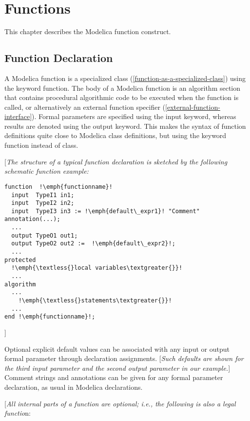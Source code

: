 \chapter{Functions}

This chapter describes the Modelica function construct.

\section{Function Declaration}

A Modelica function is a specialized class (\autoref{function-as-a-specialized-class}) using the
keyword function. The body of a Modelica function is an algorithm
section that contains procedural algorithmic code to be executed when
the function is called, or alternatively an external function specifier
(\autoref{external-function-interface}). Formal parameters are specified using the input keyword,
whereas results are denoted using the output keyword. This makes the
syntax of function definitions quite close to Modelica class
definitions, but using the keyword function instead of class.

{[}\emph{The structure of a typical function declaration is sketched by
the following schematic function example:}

\begin{lstlisting}[language=modelica,escapechar=!]
function  !\emph{functionname}!
  input  TypeI1 in1;  
  input  TypeI2 in2;
  input  TypeI3 in3 := !\emph{default\_expr1}! "Comment" annotation(...);   
  ...   
  output TypeO1 out1;
  output TypeO2 out2 :=  !\emph{default\_expr2}!;
  ... 
protected   
  !\emph{\textless{}local variables\textgreater{}}!   
  ... 
algorithm   
  ...   
    !\emph{\textless{}statements\textgreater{}}!   
  ... 
end !\emph{functionname}!; 
\end{lstlisting}

{]}

Optional explicit default values can be associated with any input or
output formal parameter through declaration assignments. {[}\emph{Such
defaults are shown for the third input parameter and the second output
parameter in our example.}{]} Comment strings and annotations can be
given for any formal parameter declaration, as usual in Modelica
declarations.

{[}\emph{All internal parts of a function are optional; i.e., the
following is also a legal functio}n:

